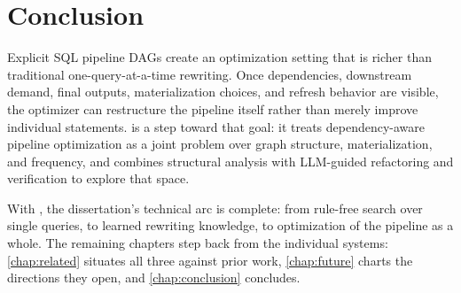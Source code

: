 \section{Conclusion}
\label{dag:sec:conclusion}

Explicit SQL pipeline DAGs create an optimization setting that is richer than traditional one-query-at-a-time rewriting. Once dependencies, downstream demand, final outputs, materialization choices, and refresh behavior are visible, the optimizer can restructure the pipeline itself rather than merely improve individual statements. \dagsmith is a step toward that goal: it treats dependency-aware pipeline optimization as a joint problem over graph structure, materialization, and frequency, and combines structural analysis with LLM-guided refactoring and verification to explore that space.

With \dagsmith, the dissertation's technical arc is complete: from
rule-free search over single queries, to learned rewriting knowledge,
to optimization of the pipeline as a whole. The remaining chapters
step back from the individual systems: \cref{chap:related} situates
all three against prior work, \cref{chap:future} charts the
directions they open, and \cref{chap:conclusion} concludes.

